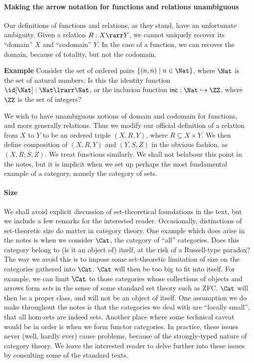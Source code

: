 \documentclass[12pt]{article}
\begin{document}
\paragraph{Making the arrow notation for functions and relations unambiguous}
Our definitions of functions and relations, as they stand, have an unfortunate ambiguity. Given a relation $R : X \rarr Y$, we cannot uniquely recover its ``domain'' $X$ and ``codomain'' $Y$. In the case of a function, we can recover the domain, because of totality, but not the codomain.

\noindent \textbf{Example} Consider the set of ordered pairs $\{ (n, n) \mid n \in \Nat \}$, where $\Nat$ is the set of natural numbers. Is this the identity function $\id[\Nat] : \Nat \lrarr \Nat$, or the inclusion function $\mathsf{inc} : \Nat \hookrightarrow \ZZ$, where $\ZZ$ is the set of integers?

We wish to have unambiguous notions of domain and codomain for functions, and more generally relations. Thus we modify our official definition of a relation from $X$ to $Y$ to be an ordered triple $(X, R, Y)$, where $R \subseteq X \times Y$. We then define composition of $(X, R, Y)$ and $(Y, S, Z)$ in the obvious fashion, as $(X, R;S, Z)$. We treat functions similarly. We shall not belabour this point in the notes, but it is implicit when we set up perhaps the most fundamental example of a category, namely the category of sets.

\paragraph{Size} We shall avoid explicit discussion of set-theoretical foundations in the text, but we include a few remarks for the interested reader. Occasionally, distinctions of set-theoretic size do matter in category theory. One example which does arise in the notes is when we consider $\Cat$, the category of ``all'' categories. Does this category belong to (is it an object of) itself, at the risk of a Russell-type paradox? The way we avoid this is to impose some set-theoretic limitation of size on the categories gathered into $\Cat$. $\Cat$  will then be too big to fit into itself. For example, we can limit $\Cat$ to those categories whose collections of objects and arrows form \emph{sets} in the sense of some standard set theory such as ZFC. $\Cat$ will then be a proper class, and will not be an object of itself.
One assumption we do make throughout the notes is that the categories we deal with are ``locally small'', \ie that all hom-sets are indeed sets. Another place where some technical caveat would be in order is when we form functor categories. In practice, these issues never (well, hardly ever) cause problems, because of the strongly-typed nature of category theory. We leave the interested reader to delve further into these issues by consulting some of the standard texts.
\end{document}
